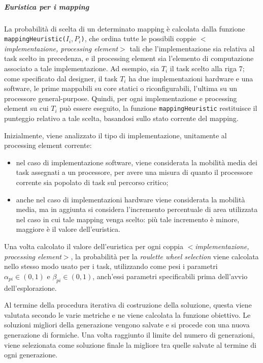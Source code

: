 \subparagraph{Euristica per i mapping}
La probabilit\`a di scelta di un determinato mapping \`e calcolata dalla funzione
\verb+mappingHeuristic(+$I_i, P_i$\verb+)+, che ordina tutte le possibili coppie
$<$\emph{implementazione, processing element}$>$ tali che l'implementazione sia relativa
al task scelto in precedenza, e il processing element sia l'elemento di computazione associato
a tale implementazione. Ad esempio, sia $T_i$ il task scelto alla riga 7; come specificato
dal designer, il task $T_i$ ha due implementazioni hardware e una software, le prime
mappabili su core statici o riconfigurabili, l'ultima su un processore general-purpose.
Quindi, per ogni implementazione e processing element su cui $T_i$ pu\`o essere eseguito,
la funzione \verb+mappingHeuristic+ restituisce il punteggio relativo a tale scelta,
basandosi sullo stato corrente del mapping.

Inizialmente, viene analizzato il tipo di implementazione, unitamente al processing element corrente:
\begin{itemize}
  \item nel caso di implementazione software, viene considerata la mobilit\`a media dei task assegnati a un processore,
    per avere una misura di quanto il processore corrente sia popolato di task sul percorso critico;
  \item anche nel caso di implementazioni hardware viene considerata la mobilit\`a media, ma in aggiunta
    si considera l'incremento percentuale di area utilizzata nel caso in cui tale mapping venga scelto:
    pi\`u tale incremento \`e minore, maggiore \`e il valore dell'euristica.
\end{itemize}
Una volta calcolato il valore dell'euristica per ogni coppia
$<$\emph{implementazione, processing element}$>$, la probabilit\`a per la \emph{roulette wheel selection}
viene calcolata nello stesso modo usato per i task, utilizzando come pesi i parametri $\alpha_{pi} \in (0,1)$
e $\beta_{pi} \in (0,1)$, anch'essi parametri specificabili prima dell'avvio dell'esplorazione.


Al termine della procedura iterativa di costruzione della soluzione, questa viene valutata
secondo le varie metriche e ne viene calcolata la funzione obiettivo. Le soluzioni migliori
della generazione vengono salvate e si procede con una nuova generazione di formiche.
Una volta raggiunto il limite del numero di generazioni, viene selezionata come
soluzione finale la migliore tra quelle salvate al termine di ogni generazione.

